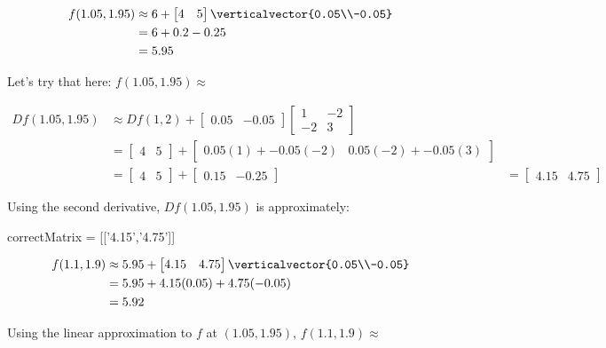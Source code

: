 \documentclass{article}
\begin{document}
\begin{question}
		\begin{solution}
			\begin{hint}
				\begin{align*}
					f(1.05,1.95) &\approx 6+\begin{bmatrix} 4 & 5 \end{bmatrix} \verticalvector{0.05\\-0.05}\\
							&=6+0.2-0.25\\
							&=5.95
				\end{align*}
			\end{hint}
			Let's try that here:  $f(1.05,1.95) \approx$ 
		\end{solution}
		\begin{solution}
			\begin{hint}
				\begin{align*}
					Df(1.05,1.95) &\approx Df(1,2)+\begin{bmatrix} 0.05 & -0.05\end{bmatrix}\begin{bmatrix} 1 & -2 \\ -2 & 3\end{bmatrix}\\
										&= \begin{bmatrix} 4 & 5 \end{bmatrix} + \begin{bmatrix} 0.05(1)+-0.05(-2) & 0.05(-2)+-0.05(3)\end{bmatrix}\\
										&=\begin{bmatrix} 4 & 5 \end{bmatrix} + \begin{bmatrix} 0.15 & -0.25\end{bmatrix}
										&=\begin{bmatrix} 4.15 & 4.75\end{bmatrix}
				\end{align*}
			\end{hint}
			Using the second derivative, $Df(1.05,1.95) $ is approximately:
			\begin{matrix-answer}
				correctMatrix = [['4.15','4.75']]
			\end{matrix-answer}
		\end{solution}
		\begin{solution}
				\begin{hint}
				\begin{align*}
					f(1.1,1.9) &\approx 5.95+\begin{bmatrix} 4.15 & 4.75 \end{bmatrix} \verticalvector{0.05\\-0.05}\\
							&=5.95+4.15(0.05)+4.75(-0.05)\\
							&=5.92
				\end{align*}
				\end{hint}
			Using the linear approximation to $f$ at $(1.05,1.95)$, $f(1.1,1.9) \approx$ \answer{$5.92$ }
		\end{solution}
		

\end{question}
\end{document}

